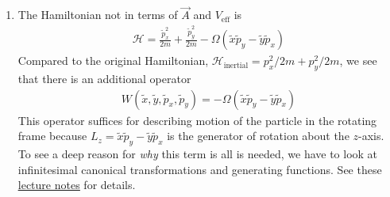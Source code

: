 \documentclass{article}
\theoremstyle{definition}
\newcommand{\ham}{\mathcal{H}}
\newcommand{\f}[2]{\frac{#1}{#2}}
\begin{document}
\begin{enumerate}[label=\alph*)]
	\item The Hamiltonian not in terms of $\vec{A}$ and $V_\text{eff}$ is 
	\begin{align*}
		\ham = \f{\tilde{p}_x^2}{2m} +\f{\tilde{p}_y^2}{2m} - \Omega (\tilde{x}  \tilde{p}_y  -  \tilde{y} \tilde{p}_x)
	\end{align*}
	Compared to the original Hamiltonian, $\ham_\text{inertial} = p_x^2/2m + p_y^2/2m$, we see that there is an additional operator 
	\begin{align*}
		W(\tilde{x},\tilde{y}, \tilde{p}_x, \tilde{p}_y) = - \Omega (\tilde{x}  \tilde{p}_y  -  \tilde{y} \tilde{p}_x)
	\end{align*}
	This operator suffices for describing motion of the particle in the rotating frame because $L_z = \tilde{x}  \tilde{p}_y  -  \tilde{y} \tilde{p}_x$ is the generator of rotation about the $z$-axis. To see a deep reason for \textit{why} this term is all is needed, we have to look at infinitesimal canonical transformations and generating functions.  See these \href{https://ocw.mit.edu/courses/8-09-classical-mechanics-iii-fall-2014/f00f7f68ac7ba346a0868efb7430582c_MIT8_09F14_Chapter_4.pdf}{\underline{lecture notes}} for details. 
	

\end{enumerate}
\end{document}

